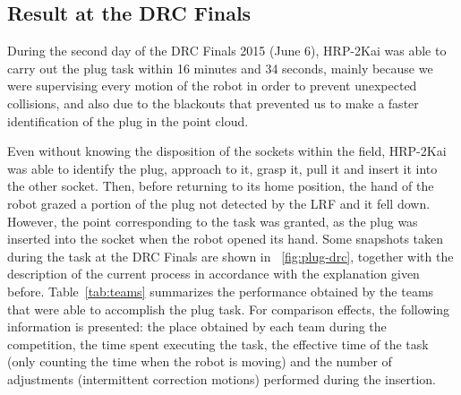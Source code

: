 	\subsection{Result at the DRC Finals}
		
		During the second day of the DRC Finals 2015 (June 6), HRP-2Kai was able to carry out
		the plug task within 16 minutes and 34 seconds, mainly because we were supervising every motion of the
		robot in order to prevent unexpected collisions, and also due to the blackouts that prevented us to make
		a faster identification of the plug in the point cloud.
		
		Even without knowing the disposition of the sockets within the field, HRP-2Kai was able to identify the
		plug, approach to it, grasp it, pull it and insert it into the other socket.
		Then, before returning to its home position, the hand of the robot grazed a portion of the plug not
		detected by the LRF and it fell down.
		However, the point corresponding to the task was granted, as the plug was inserted into the socket
		when the robot opened its hand.
		Some snapshots taken during the task at the DRC Finals are shown in \figurename~\ref{fig:plug-drc},
		together with the description of the current process in accordance with the explanation given before.
		Table~\ref{tab:teams} summarizes the performance obtained by the teams that were able to
		accomplish the plug task.
		For comparison effects, the following information is presented:
		the place obtained by each team during the competition, the time spent executing the task,
		the effective time of the task (only counting the time when the robot is moving) and the number
		of adjustments (intermittent correction motions) performed during the insertion.
		
